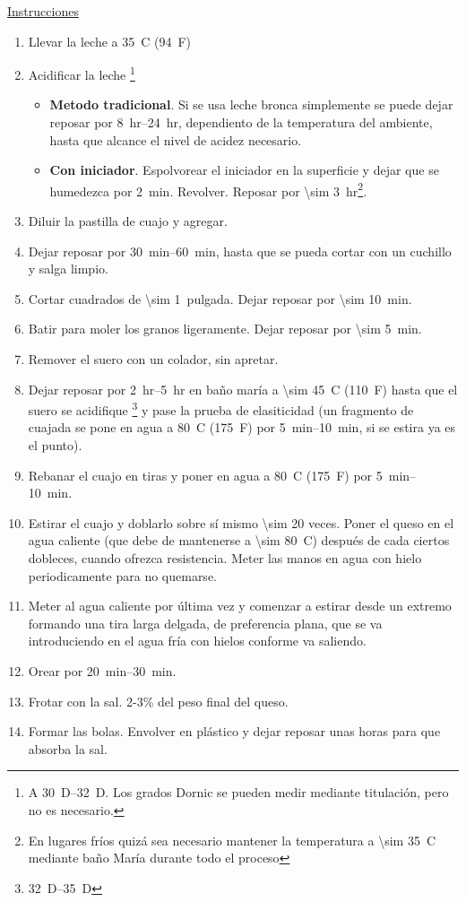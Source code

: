 \underline{Instrucciones}
\begin{enumerate}
\item Llevar la leche a \SI{35}{C} (\SI{94}{F})
\item Acidificar la leche \footnote{A \SIrange{30}{32}{D}. Los grados Dornic se pueden medir mediante titulación, pero no es necesario.} 
\begin{itemize}
\item \textbf{Metodo tradicional}. Si se usa leche bronca simplemente se puede dejar reposar por \SIrange{8}{24}{hr}, dependiento de la temperatura del ambiente, hasta que alcance el nivel de acidez necesario.
\item \textbf{Con iniciador}. Espolvorear el iniciador en la superficie y dejar que se humedezca por \SI{2}{min}. Revolver. Reposar por \SI{\sim 3}{hr}\footnote{En lugares fríos quizá sea necesario mantener la temperatura a \SI{\sim 35}{C} mediante baño María durante todo el proceso}.
\end{itemize}
\item Diluir la pastilla de cuajo y agregar.
\item Dejar reposar por \SIrange{30}{60}{min}, hasta que se pueda cortar con un cuchillo y salga limpio.
\item Cortar cuadrados de \SI{\sim 1}{pulgada}. Dejar reposar por \SI{\sim 10}{min}.
\item Batir para moler los granos ligeramente. Dejar reposar por \SI{\sim 5}{min}.
\item Remover el suero con un colador, sin apretar.
\item Dejar reposar por \SIrange{2}{5}{hr} en baño maría a \SI{\sim 45}{C} (\SI{110}{F}) hasta que el suero se acidifique \footnote{\SIrange{32}{35}{D}} y pase la prueba de elasiticidad (un fragmento de cuajada se pone en agua a \SI{80}{C} (\SI{175}{F}) por \SIrange{5}{10}{min}, si se estira ya es el punto).
\item Rebanar el cuajo en tiras y poner en agua a \SI{80}{C} (\SI{175}{F}) por  \SIrange{5}{10}{min}.
\item Estirar el cuajo y doblarlo sobre sí mismo \num{\sim 20} veces. Poner el queso en el agua caliente (que debe de mantenerse a \SI{\sim 80}{C}) después de cada ciertos dobleces, cuando ofrezca resistencia. Meter las manos en agua con hielo periodicamente para no quemarse.
\item Meter al agua caliente por última vez y comenzar a estirar desde un extremo formando una tira larga delgada, de preferencia plana, que se va introduciendo en el agua fría con hielos conforme va saliendo. 
\item Orear por \SIrange{20}{30}{min}.
\item Frotar con la sal. 2-3\% del peso final del queso.
\item Formar las bolas. Envolver en plástico y dejar reposar unas horas para que absorba la sal.
\end{enumerate}
